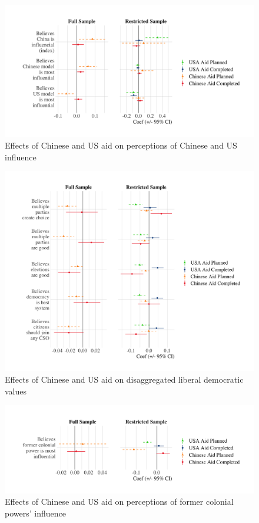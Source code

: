 \documentclass[9pt]{article}
\begin{document}
\begin{figure}[H]
\centering
\includegraphics[width=1\textwidth]{figures/figure_a18.png}
\caption{Effects of Chinese and US aid on perceptions of Chinese and US influence}
\end{figure}

\begin{figure}[H]
\centering
\includegraphics[width=1\textwidth]{figures/figure_a19.png}
\caption{Effects of Chinese and US aid on disaggregated liberal democratic values}
\end{figure}

\begin{figure}[H]
\centering
\includegraphics[width=1\textwidth]{figures/figure_a20.png}
\caption{Effects of Chinese and US aid on perceptions of former colonial powers' influence}
\end{figure}
\end{document}
